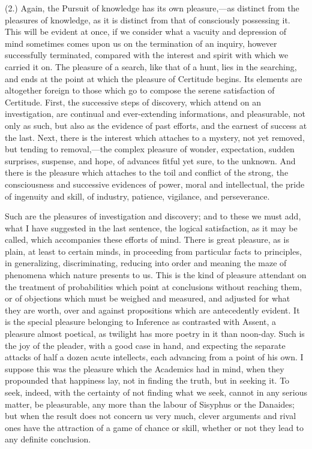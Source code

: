 (2.) Again, the Pursuit of knowledge has its own pleasure,—as
distinct from the pleasures of knowledge, as it is distinct from
that of consciously possessing it. This will be evident at once, if we
consider what a vacuity and depression of mind sometimes comes upon us
on the termination of an inquiry, however successfully terminated,
compared with the interest and spirit with which we carried it on. The
pleasure of a search, like that of a hunt, lies in the searching, and
ends at the point at which the pleasure of Certitude begins. Its
elements are altogether foreign to those which go to compose the
serene satisfaction of Certitude. First, the successive steps of
discovery, which attend on an investigation, are continual and
ever-extending informations, and pleasurable, not only as such, but
also as the evidence of past efforts, and the earnest of success at
the last. Next, there is the interest which attaches to a mystery, not
yet removed, but tending to removal,—the complex pleasure of wonder,
expectation, sudden surprises, suspense, and hope, of advances fitful
yet sure, to the unknown. And there is the pleasure which attaches to
the toil and conflict of the strong, the consciousness and successive
evidences of power, moral and intellectual, the pride of ingenuity and
skill, of industry, patience, vigilance, and perseverance.

Such are the pleasures of investigation and discovery; and to these
we must add, what I have suggested in the last sentence, the logical
satisfaction, as it may be called, which accompanies these efforts of
mind. There is great pleasure, as is plain, at least to certain minds,
in proceeding from particular facts to principles, in generalizing,
discriminating, reducing into order and meaning the maze of phenomena
which nature presents to us. This is the kind of pleasure
attendant on the treatment of probabilities which point at conclusions
without reaching them, or of objections which must be weighed and
measured, and adjusted for what they are worth, over and against
propositions which are antecedently evident. It is the special
pleasure belonging to Inference as contrasted with Assent, a pleasure
almost poetical, as twilight has more poetry in it than noon-day. Such
is the joy of the pleader, with a good case in hand, and expecting the
separate attacks of half a dozen acute intellects, each advancing from
a point of his own. I suppose this was the pleasure which the
Academics had in mind, when they propounded that happiness lay, not in
finding the truth, but in seeking it. To seek, indeed, with the
certainty of not finding what we seek, cannot in any serious matter,
be pleasurable, any more than the labour of Sisyphus or the Danaides;
but when the result does not concern us very much, clever arguments
and rival ones have the attraction of a game of chance or skill,
whether or not they lead to any definite conclusion.

